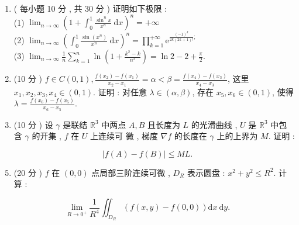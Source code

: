 \documentclass[10pt]{article}
\begin{document}
\begin{enumerate}
  \item ( 每小题  10  分 ,  共  30  分 )  证明如下极限 :\\
(1) $\lim _{n \rightarrow \infty}\left(1+\int_{0}^{1} \frac{\sin ^{n} x}{x^{n}} \mathrm{~d} x\right)^{n}=+\infty$\\
(2) $\lim _{n \rightarrow \infty}\left(\int_{0}^{1} \frac{\sin \left(x^{n}\right)}{x^{n}} \mathrm{~d} x\right)^{n}=\prod_{k=1}^{+\infty} \mathrm{e}^{\frac{(-1)^{k}}{2 k(2 k+1) !} \text {; }}$\\
(3) $\lim _{n \rightarrow \infty} \frac{1}{n} \sum_{k=1}^{n} \ln \left(1+\frac{k^{2}-k}{n^{2}}\right)=\ln 2-2+\frac{\pi}{2}$.

  \item (10  分 ) $f \in C(0,1), \frac{f\left(x_{2}\right)-f\left(x_{1}\right)}{x_{2}-x_{1}}=\alpha<\beta=\frac{f\left(x_{4}\right)-f\left(x_{3}\right)}{x_{4}-x_{3}}$,  这里  $x_{1}, x_{2}, x_{3}, x_{4} \in(0,1)$.  证明 :  对任意  $\lambda \in(\alpha, \beta)$,  存在  $x_{5}, x_{6} \in(0,1)$,  使得  $\lambda=\frac{f\left(x_{6}\right)-f\left(x_{5}\right)}{x_{6}-x_{5}}$.

  \item (10  分 )  设  $\gamma$  是联结  $\mathbb{R}^{3}$  中两点  $A, B$  且长度为  $L$  的光滑曲线 , $U$  是  $\mathbb{R}^{3}$  中包含  $\gamma$  的开集 , $f$  在  $U$  上连续可   微 ,  梯度  $\nabla f$  的长度在  $\gamma$  上的上界为  $M$.  证明 :

\end{enumerate}
$$
|f(A)-f(B)| \leqslant M L .
$$

\begin{enumerate}
  \setcounter{enumi}{4}
  \item (20  分 ) $f$  在  $(0,0)$  点局部三阶连续可微 , $D_{R}$  表示圆盘 : $x^{2}+y^{2} \leqslant R^{2}$.  计算 :
\end{enumerate}
$$
\lim _{R \rightarrow 0^{+}} \frac{1}{R^{4}} \iint_{D_{R}}(f(x, y)-f(0,0)) \mathrm{d} x \mathrm{~d} y .
$$
\end{document}
